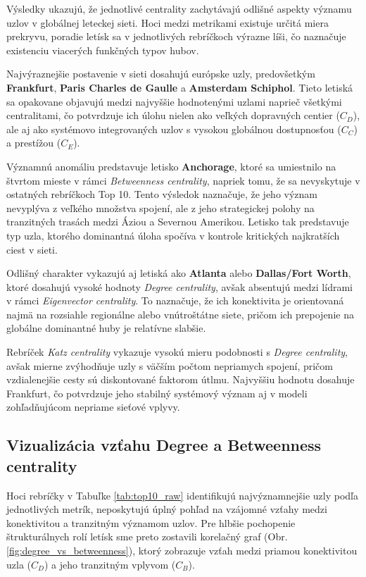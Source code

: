 Výsledky ukazujú, že jednotlivé centrality zachytávajú odlišné aspekty významu uzlov v globálnej leteckej sieti. Hoci medzi metrikami 
existuje určitá miera prekryvu, poradie letísk sa v jednotlivých rebríčkoch výrazne líši, čo naznačuje existenciu viacerých funkčných typov hubov.

Najvýraznejšie postavenie v sieti dosahujú európske uzly, predovšetkým \textbf{Frankfurt}, \textbf{Paris Charles de Gaulle} 
a \textbf{Amsterdam Schiphol}. Tieto letiská sa opakovane objavujú medzi najvyššie hodnotenými uzlami naprieč všetkými centralitami, 
čo potvrdzuje ich úlohu nielen ako veľkých dopravných centier ($C_D$), ale aj ako systémovo integrovaných uzlov s vysokou globálnou dostupnosťou 
($C_C$) a prestížou ($C_E$).

Významnú anomáliu predstavuje letisko \textbf{Anchorage}, ktoré sa umiestnilo na štvrtom mieste v rámci \textit{Betweenness centrality}, 
napriek tomu, že sa nevyskytuje v ostatných rebríčkoch Top 10. Tento výsledok naznačuje, že jeho význam nevyplýva z veľkého množstva spojení, 
ale z jeho strategickej polohy na tranzitných trasách medzi Áziou a Severnou Amerikou. Letisko tak predstavuje typ uzla, ktorého dominantná 
úloha spočíva v kontrole kritických najkratších ciest v sieti.

Odlišný charakter vykazujú aj letiská ako \textbf{Atlanta} alebo \textbf{Dallas/Fort Worth}, ktoré dosahujú vysoké hodnoty 
\textit{Degree centrality}, avšak absentujú medzi lídrami v rámci \textit{Eigenvector centrality}. To naznačuje, že ich konektivita je 
orientovaná najmä na rozsiahle regionálne alebo vnútroštátne siete, pričom ich prepojenie na globálne dominantné huby je relatívne slabšie.

Rebríček \textit{Katz centrality} vykazuje vysokú mieru podobnosti s \textit{Degree centrality},  avšak mierne zvýhodňuje uzly s väčším počtom 
nepriamych spojení, pričom vzdialenejšie cesty sú diskontované faktorom útlmu. Najvyššiu hodnotu dosahuje Frankfurt, čo potvrdzuje jeho stabilný 
systémový význam aj v modeli zohľadňujúcom nepriame sieťové vplyvy.

\subsection{Vizualizácia vzťahu Degree a Betweenness centrality}

Hoci rebríčky v Tabuľke \ref{tab:top10_raw} identifikujú najvýznamnejšie uzly podľa jednotlivých metrík, neposkytujú úplný pohľad na 
vzájomné vzťahy medzi konektivitou a tranzitným významom uzlov. Pre hlbšie pochopenie štrukturálnych rolí letísk sme preto zostavili 
korelačný graf (Obr. \ref{fig:degree_vs_betweenness}), ktorý zobrazuje vzťah medzi priamou konektivitou uzla ($C_D$) a jeho tranzitným vplyvom ($C_B$).

